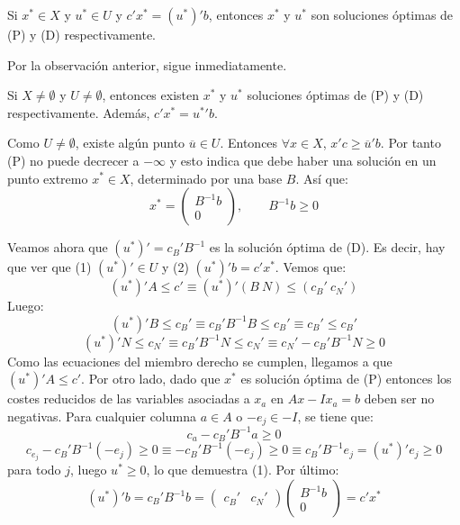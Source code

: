 \documentclass[PM.tex]{subfiles}
\begin{document}
\begin{coro}
Si $x^* \in X$ y $u^* \in U$ y $c'x^* = (u^*)'b$, entonces $x^*$ y $u^*$ son soluciones óptimas de (P) y (D) respectivamente.
\end{coro}

\begin{dem}
Por la observación anterior, sigue inmediatamente.
\end{dem}

\begin{theorem}
Si $X \neq \emptyset$ y $U \neq \emptyset$, entonces existen $x^*$ y $u^*$ soluciones óptimas de (P) y (D) respectivamente. Además, $c'x^* = {u^*}'b$.
\end{theorem}

\begin{dem}
Como $U \neq \emptyset$, existe algún punto $\overline{u} \in U$. Entonces $\forall x \in X$, $x'c ≥ \overline{u}'b$. Por tanto (P) no puede decrecer a $-\infty$ y esto indica que debe haber una solución en un punto extremo $x^* \in X$, determinado por una base $B$. Así que:
\[ x^* = \begin{pmatrix}B^{-1} b \\ 0\end{pmatrix}, \qquad B^{-1}b ≥ 0 \]

Veamos ahora que $(u^*)' = c_B'B^{-1}$ es la solución óptima de (D). Es decir, hay que ver que (1) $(u^*)' \in U$ y (2) $(u^*)'b = c'x^*$. Vemos que:
\[ (u^*)'A ≤ c' \equiv (u^*)' (B \ N) ≤ (c_B' \ c_N') \]
Luego:
\[ (u^*)'B ≤ c_B' \equiv c_B'B^{-1}B ≤ c_B' \equiv c_B' ≤ c_B'\]
\[ (u^*)'N ≤ c_N' \equiv c_B'B^{-1}N ≤ c_N' \equiv c_N' - c_B'B^{-1}N ≥ 0\]
Como las ecuaciones del miembro derecho se cumplen, llegamos a que $(u^*)'A ≤ c'$. Por otro lado, dado que $x^*$ es solución óptima de (P) entonces los costes reducidos de las variables asociadas a $x_a$ en $Ax - I x_a = b$ deben ser no negativas. Para cualquier columna $a \in A$ o $-e_j \in -I$, se tiene que:
\[ c_a - c_B' B^{-1} a ≥ 0 \]
\[ c_{e_j} - c_B' B^{-1}(-e_j) ≥ 0 \equiv  -c_B'B^{-1}(-e_j) ≥ 0 \equiv c_B'B^{-1}e_j = (u^*)'e_j ≥ 0 \]
para todo $j$, luego $u^* ≥ 0$, lo que demuestra (1). Por último:
\[ (u^*)'b = c_B'B^{-1}b = \begin{pmatrix}c_B' & c_N'\end{pmatrix}\begin{pmatrix}B^{-1}b\\0\end{pmatrix} = c'x^* \]
\end{dem}
\end{document}
